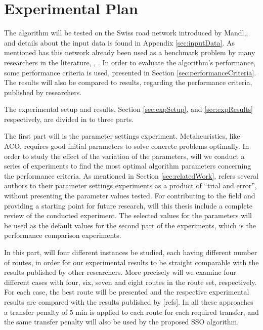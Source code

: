 \section{Experimental Plan}
\label{sec:expPlan}
The algorithm will be tested on the Swiss road network introduced by Mandl,\citep{mandl79}, and details about the input data is found in Appendix \vref{sec:inputData}. As mentioned has this network already been used as a benchmark problem by many researchers in the literature\citep{kechagiopoulos14}, \citep{mandl79}, \citep{fan09}. In order to evaluate the algorithm's performance, some performance criteria is used, presented in Section \vref{sec:performanceCriteria}. The results will also be compared to results, regarding the performance criteria, published by researchers.

The experimental setup and results, Section \vref{sec:expSetup}, and \vref{sec:expResults} respectively, are divided in to three parts. 

The first part will is the parameter settings experiment. Metaheuristics, like ACO, requires good initial parameters to solve concrete problems optimally. In order to study the effect of the variation of the parameters, will we conduct a series of experiments to find the most optimal algorithm parameters concerning the performance criteria. As mentioned in Section \vref{sec:relatedWork}, refers several authors to their parameter settings experiments as a product of ``trial and error'', without presenting the parameter values tested. For contributing to the field and providing a starting point for future research, will this thesis include a complete review of the conducted experiment. The selected values for the parameters will be used as the default values for the second part of the experiments, which is the performance comparison experiments.

In this part, will four different instances be studied, each having different number of routes, in order for our experimental results to be straight comparable with the results published by other researchers. More precisely will we examine four different cases with four, six, seven and eight routes in the route set, respectively. For each case, the best route will be presented and the respective experimental results are compared with the results published by [refs]. In all these approaches a transfer penalty of 5 min is applied to each route for each required transfer, and the same transfer penalty will also be used by the proposed SSO algorithm. 


